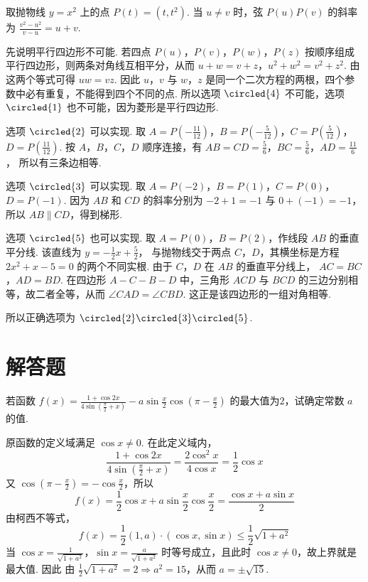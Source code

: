 \begin{solution}
取抛物线 \(y=x^2\) 上的点 \(P(t)=(t,t^2)\). 当 \(u\ne v\) 时，弦 \(P(u)P(v)\) 的斜率为
\(\frac{v^2-u^2}{v-u}=u+v\).

先说明平行四边形不可能. 若四点 \(P(u)\)，\(P(v)\)，\(P(w)\)，\(P(z)\) 按顺序组成平行四边形，则两条对角线互相平分，从而
\(u+w=v+z\)，\(u^2+w^2=v^2+z^2\).
由这两个等式可得 \(uw=vz\). 因此 \(u\)，\(v\) 与 \(w\)，\(z\) 是同一个二次方程的两根，四个参数中必有重复，不能得到四个不同的点. 所以选项 \(\circled{4}\) 不可能，选项 \(\circled{1}\) 也不可能，因为菱形是平行四边形.

选项 \(\circled{2}\) 可以实现. 取
\(A=P\left(-\frac{11}{12}\right)\)，\(B=P\left(-\frac5{12}\right)\)，\(C=P\left(\frac5{12}\right)\)，\(D=P\left(\frac{11}{12}\right)\).
按 \(A\)，\(B\)，\(C\)，\(D\) 顺序连接，有
\(AB=CD=\frac56\)，\(BC=\frac56\)，\(AD=\frac{11}{6}\)，
所以有三条边相等.

选项 \(\circled{3}\) 可以实现. 取
\(A=P(-2)\)，\(B=P(1)\)，\(C=P(0)\)，\(D=P(-1)\).
因为 \(AB\) 和 \(CD\) 的斜率分别为 \(-2+1=-1\) 与 \(0+(-1)=-1\)，所以 \(AB\parallel CD\)，得到梯形.

选项 \(\circled{5}\) 也可以实现. 取 \(A=P(0)\)，\(B=P(2)\)，作线段 \(AB\) 的垂直平分线. 该直线为
\(y=-\frac12x+\frac52\)，
与抛物线交于两点 \(C\)，\(D\)，其横坐标是方程
\(2x^2+x-5=0\)
的两个不同实根. 由于 \(C\)，\(D\) 在 \(AB\) 的垂直平分线上，
\(AC=BC\)，\(AD=BD\).
在四边形 \(A-C-B-D\) 中，三角形 \(ACD\) 与 \(BCD\) 的三边分别相等，故二者全等，从而
\(\angle CAD=\angle CBD\).
这正是该四边形的一组对角相等.

所以正确选项为 \(\circled{2}\circled{3}\circled{5}\).
\end{solution}

\section{解答题}
\begin{problem}
若函数 \( f(x) = \frac{1 + \cos 2x}{4\sin\left(\frac{\pi}{2} + x\right)} - a\sin \frac{x}{2}\cos \left(\pi - \frac{x}{2}\right) \) 的最大值为\(2\)，试确定常数 \( a \) 的值.
\end{problem}

\begin{solution}
原函数的定义域满足 \(\cos x\ne0\). 在此定义域内，
\[
\frac{1+\cos2x}{4\sin\left(\frac{\pi}{2}+x\right)}=\frac{2\cos^{2}x}{4\cos x}=\frac{1}{2}\cos x
\]
又 \(\cos\left(\pi-\frac{x}{2}\right)=-\cos\frac{x}{2}\)，所以
\[
f(x)=\frac{1}{2}\cos x+a\sin\frac{x}{2}\cos\frac{x}{2}=\frac{\cos x+a\sin x}{2}
\]
由柯西不等式，
\[
f(x)=\frac{1}{2}(1,a)\cdot(\cos x,\sin x)\leqslant\frac{1}{2}\sqrt{1+a^{2}}
\]
当 \(\cos x=\frac{1}{\sqrt{1+a^{2}}}\)，\(\sin x=\frac{a}{\sqrt{1+a^{2}}}\) 时等号成立，且此时 \(\cos x\ne0\)，故上界就是最大值. 因此
由 \(\frac{1}{2}\sqrt{1+a^{2}}=2\Longrightarrow a^{2}=15\)，从而 \(a=\pm\sqrt{15}\).
\end{solution}

